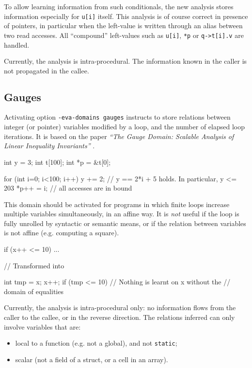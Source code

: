 \documentclass{frama-c-book}
\begin{document}
To allow learning information from such conditionals,
the new analysis stores information especially for \texttt{u[i]} itself.
This analysis is of course correct in presence of pointers, in particular
when the left-value is written through an alias between two read accesses.
All ``compound'' left-values such as \texttt{u[i]}, \texttt{*p} or
\texttt{q->t[i].v} are handled.

Currently, the analysis is intra-procedural. The information known
in the caller is not propagated in the callee.

\subsection{Gauges}
\label{sec:gauges}

Activating option \texttt{-eva-domains gauges} instructs \Eva{} to
store relations between integer (or pointer) variables modified by a
loop, and the number of elapsed loop iterations. It is based on the
paper \emph{``The Gauge Domain: Scalable Analysis of Linear
Inequality Invariants''}
\cite{DBLP:conf/cav/Venet12}.


\begin{listing-nonumber}
int y = 3;
int t[100];
int *p = &t[0];

for (int i=0; i<100; i++) {
  y += 2; // y == 2*i + 5 holds. In particular, y <= 203
  *p++ = i; // all accesses are in bound
}
\end{listing-nonumber}

This domain should be activated for programs in which finite loops
increase multiple variables simultaneously, in an affine way. It
is \emph{not} useful if the loop is fully unrolled by syntactic or
semantic means, or if the relation between
variables is not affine (e.g. computing a square).

\begin{listing-nonumber}
  if (x++ <= 10) { ... }

// Transformed into

  int tmp = x;
  x++;
  if (tmp <= 10) { // Nothing is learnt on x without the
                   // domain of equalities }
\end{listing-nonumber}

Currently, the analysis is intra-procedural only: no information
flows from the caller to the callee, or in the reverse direction.
The relations inferred can only involve variables that are:
\begin{itemize}
\item local to a function (e.g. not a global), and not \texttt{static};
\item scalar (not a field of a struct, or a cell in an array).
\end{itemize}
\end{document}
